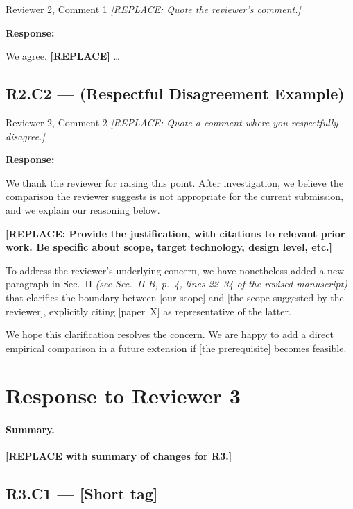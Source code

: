 \documentclass[11pt,letterpaper]{article}
\newcommand{\response}{\par\textbf{\color{responseaccent}Response:}\par}
\newcommand{\paperref}[1]{\textit{(see #1 of the revised manuscript)}}
\begin{document}
\begin{reviewercomment}{Reviewer 2, Comment 1}
\textit{[REPLACE: Quote the reviewer's comment.]}
\end{reviewercomment}

\response We agree. \textbf{[REPLACE]} \ldots

\subsection*{R2.C2 --- (Respectful Disagreement Example)}

\begin{reviewercomment}{Reviewer 2, Comment 2}
\textit{[REPLACE: Quote a comment where you respectfully disagree.]}
\end{reviewercomment}

\response We thank the reviewer for raising this point. After
investigation, we believe the comparison the reviewer suggests is not
appropriate for the current submission, and we explain our reasoning
below.

\textbf{[REPLACE: Provide the justification, with citations to relevant
prior work. Be specific about scope, target technology, design level,
etc.]}

To address the reviewer's underlying concern, we have nonetheless added
a new paragraph in Sec.~II \paperref{Sec.~II-B, p.~4, lines 22--34}
that clarifies the boundary between [our scope] and [the scope suggested
by the reviewer], explicitly citing [paper~X] as representative of the
latter.

We hope this clarification resolves the concern. We are happy to add a
direct empirical comparison in a future extension if [the prerequisite]
becomes feasible.

\section*{Response to Reviewer 3}

\paragraph{Summary.} \textbf{[REPLACE with summary of changes for R3.]}

\subsection*{R3.C1 --- [Short tag]}
\end{document}
